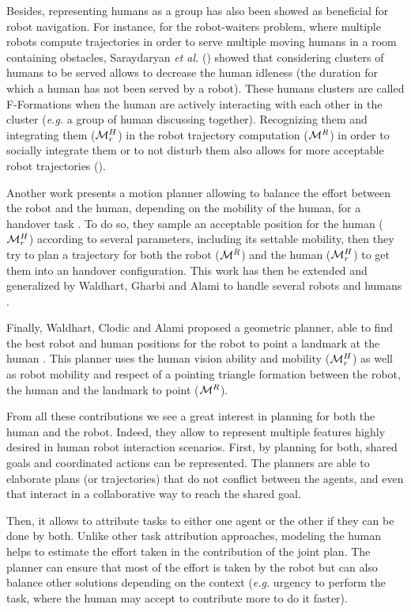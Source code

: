\documentclass[a4paper,11pt,twoside]{StyleThese}
\begin{document}
Besides, representing humans as a group has also been showed as beneficial for robot navigation. For instance, for the robot-waiters problem, where multiple robots compute trajectories in order to serve multiple moving humans in a room containing obstacles, Saraydaryan \textit{et al.} (\cite{saraydaryan2015robots}) showed that considering clusters of humans to be served allows to decrease the human idleness (the duration for which a human has not been served by a robot). These humans clusters are called F-Formations when the human are actively interacting with each other in the cluster (\textit{e.g.} a group of human discussing together). Recognizing them and integrating them ($\mathcal{M}^H_r$) in the robot trajectory computation ($\mathcal{M}^R$) in order to socially integrate them or to not disturb them also allows for more acceptable robot trajectories (\cite{althaus2004navigation}).

Another work presents a motion planner allowing to balance the effort between the robot and the human, depending on the mobility of the human, for a handover task \cite{mainprice2012sharing}. To do so, they sample an acceptable position for the human ($\mathcal{M}^H_r$) according to several parameters, including its settable mobility, then they try to plan a trajectory for both the robot ($\mathcal{M}^R$) and the human ($\mathcal{M}^H_r$) to get them into an handover configuration. This work has then be extended and generalized by Waldhart, Gharbi and Alami to handle several robots and humans \cite{waldhart2015planning}.

Finally, Waldhart, Clodic and Alami proposed a geometric planner, able to find the best robot and human positions for the robot to point a landmark at the human \cite{waldhart_reasoning_shared_2019}. This planner uses the human vision ability and mobility ($\mathcal{M}^H_r$) as well as robot mobility and respect of a pointing triangle formation between the robot, the human and the landmark to point ($\mathcal{M}^R$).

From all these contributions we see a great interest in planning for both the human and the robot. Indeed, they allow to represent multiple features highly desired in human robot interaction scenarios. First, by planning for both, shared goals and coordinated actions can be represented. The planners are able to elaborate plans (or trajectories) that do not conflict between the agents, and even that interact in a collaborative way to reach the shared goal. 

Then, it allows to attribute tasks to either one agent or the other if they can be done by both. Unlike other task attribution approaches, modeling the human helps to estimate the effort taken in the contribution of the joint plan. The planner can ensure that most of the effort is taken by the robot but can also balance other solutions depending on the context (\textit{e.g.} urgency to perform the task, where the human may accept to contribute more to do it faster). 
\end{document}
